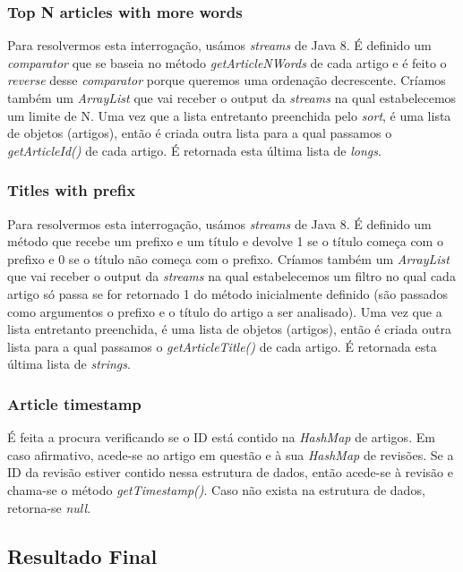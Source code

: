 \documentclass[a4paper]{article}
\begin{document}
\subsubsection{Top N articles with more words}
Para resolvermos esta interrogação, usámos \textit{streams} de Java 8. É definido um \textit{comparator} que se baseia no método \textit{getArticleNWords} de cada artigo e é feito o \textit{reverse} desse \textit{comparator} porque queremos uma ordenação decrescente. Críamos também um \textit{ArrayList} que vai receber o output da \textit{streams} na qual estabelecemos um limite de N. Uma vez que a lista entretanto preenchida pelo \textit{sort}, é uma lista de objetos (artigos), então é criada outra lista para a qual passamos o \textit{getArticleId()} de cada artigo. É retornada esta última lista de \textit{longs}.

\subsubsection{Titles with prefix}
Para resolvermos esta interrogação, usámos \textit{streams} de Java 8. É definido um método que recebe um prefixo e um título e devolve 1 se o título começa com o prefixo e 0 se o título não começa com o prefixo. Críamos também um \textit{ArrayList} que vai receber o output da \textit{streams} na qual estabelecemos um filtro no qual cada artigo só passa se for retornado 1 do método inicialmente definido (são passados como argumentos o prefixo e o título do artigo a ser analisado). Uma vez que a lista entretanto preenchida, é uma lista de objetos (artigos), então é criada outra lista para a qual passamos o \textit{getArticleTitle()} de cada artigo. É retornada esta última lista de \textit{strings}.

\subsubsection{Article timestamp} 
É feita a procura verificando se o ID está contido na \textit{HashMap} de artigos. Em caso afirmativo, acede-se ao artigo em questão e à sua \textit{HashMap} de revisões. Se a ID da revisão estiver contido nessa estrutura de dados, então acede-se à revisão e chama-se o método \textit{getTimestamp()}. Caso não exista na estrutura de dados, retorna-se \textit{null}.

\pagebreak
\subsection{Resultado Final}
\end{document}
